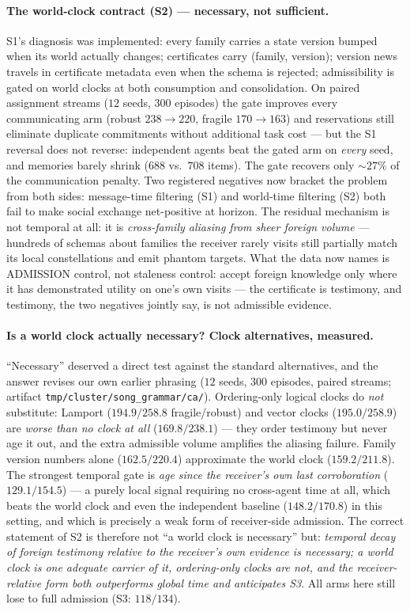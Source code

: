 \documentclass{article}
\begin{document}
\paragraph{The world-clock contract (S2) --- necessary, not
sufficient.} S1's diagnosis was implemented: every family carries a
state version bumped when its world actually changes; certificates
carry (family, version); version news travels in certificate metadata
even when the schema is rejected; admissibility is gated on world
clocks at both consumption and consolidation. On paired assignment
streams ($12$ seeds, $300$ episodes) the gate improves every
communicating arm (robust $238 \to 220$, fragile $170 \to 163$) and
reservations still eliminate duplicate commitments without additional task cost --- but
the S1 reversal does not reverse: independent agents beat the gated
arm on \emph{every} seed, and memories barely shrink ($688$ vs.\
$708$ items). The gate recovers only ${\sim}27\%$ of the
communication penalty. Two registered negatives now bracket the
problem from both sides: message-time filtering (S1) and world-time
filtering (S2) both fail to make social exchange net-positive at
horizon. The residual mechanism is not temporal at all: it is
\emph{cross-family aliasing from sheer foreign volume} --- hundreds
of schemas about families the receiver rarely visits still partially
match its local constellations and emit phantom targets. What the
data now names is ADMISSION control, not staleness control: accept
foreign knowledge only where it has demonstrated utility on one's own
visits --- the certificate is testimony, and testimony, the two
negatives jointly say, is not admissible evidence.

\paragraph{Is a world clock actually necessary? Clock alternatives,
measured.} ``Necessary'' deserved a direct test against the standard
alternatives, and the answer revises our own earlier phrasing
($12$ seeds, $300$ episodes, paired streams; artifact
\texttt{tmp/cluster/song\_grammar/ca/}). Ordering-only logical clocks
do \emph{not} substitute: Lamport ($194.9/258.8$ fragile/robust) and
vector clocks ($195.0/258.9$) are \emph{worse than no clock at all}
($169.8/238.1$) --- they order testimony but never age it out, and the
extra admissible volume amplifies the aliasing failure. Family
version numbers alone ($162.5/220.4$) approximate the world clock
($159.2/211.8$). The strongest temporal gate is \emph{age since the
receiver's own last corroboration} ($129.1/154.5$) --- a purely local
signal requiring no cross-agent time at all, which beats the world
clock and even the independent baseline ($148.2/170.8$) in this
setting, and which is precisely a weak form of receiver-side
admission. The correct statement of S2 is therefore not ``a world
clock is necessary'' but: \emph{temporal decay of foreign testimony
relative to the receiver's own evidence is necessary; a world clock
is one adequate carrier of it, ordering-only clocks are not, and the
receiver-relative form both outperforms global time and anticipates
S3}. All arms here still lose to full admission (S3: $118/134$).
\end{document}
